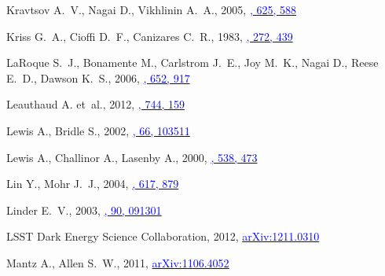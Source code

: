 \documentclass[useAMS,usenatbib,usegraphicx]{mn2e}
\begin{document}
\begin{thebibliography}{}
{Kravtsov} A.~V., {Nagai} D.,  {Vikhlinin} A.~A., 2005,
  \href{http://adsabs.harvard.edu/abs/2005ApJ...625..588K}{\textcolor{blue}{\apj,
  625, 588}}

{Kriss} G.~A., {Cioffi} D.~F.,  {Canizares} C.~R., 1983,
  \href{http://adsabs.harvard.edu/abs/1983ApJ...272..439K}{\textcolor{blue}{\apj,
  272, 439}}

{LaRoque} S.~J., {Bonamente} M., {Carlstrom} J.~E., {Joy} M.~K., {Nagai} D.,
  {Reese} E.~D.,  {Dawson} K.~S., 2006,
  \href{http://adsabs.harvard.edu/abs/2006ApJ...652..917L}{\textcolor{blue}{\apj,
  652, 917}}

{Leauthaud} A. et~al., 2012,
  \href{http://adsabs.harvard.edu/abs/2012ApJ...744..159L}{\textcolor{blue}{\apj,
  744, 159}}

{Lewis} A.,  {Bridle} S., 2002,
  \href{http://adsabs.harvard.edu/abs/2002PhRvD..66j3511L}{\textcolor{blue}{\prd,
  66, 103511}}

{Lewis} A., {Challinor} A.,  {Lasenby} A., 2000,
  \href{http://adsabs.harvard.edu/abs/2000ApJ...538..473L}{\textcolor{blue}{\apj,
  538, 473}}

{Lin} Y.,  {Mohr} J.~J., 2004,
  \href{http://adsabs.harvard.edu/abs/2004ApJ...617..879L}{\textcolor{blue}{\apj,
  617, 879}}

{Linder} E.~V., 2003,
  \href{http://adsabs.harvard.edu/abs/2003PhRvL..90i1301L}{\textcolor{blue}{\prl,
  90, 091301}}

{LSST Dark Energy Science Collaboration}, 2012,
  \href{http://arxiv.org/abs/1211.0310}{\textcolor{blue}{arXiv:1211.0310}}

{Mantz} A.,  {Allen} S.~W., 2011,
  \href{http://arxiv.org/abs/1106.4052}{\textcolor{blue}{arXiv:1106.4052}}


\end{thebibliography}
\end{document}
